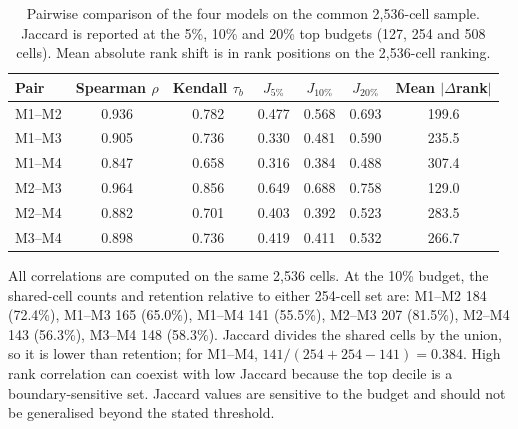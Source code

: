 \begin{table}[H]
\centering
\small
\caption{Pairwise comparison of the four models on the common 2,536-cell sample.
Jaccard is reported at the 5\%, 10\% and 20\% top budgets (127, 254 and 508
cells). Mean absolute rank shift is in rank positions on the 2,536-cell
ranking.}
\label{tab:comparison}
\begin{threeparttable}
\begin{tabular}{@{}lcccccc@{}}
\toprule
Pair & Spearman $\rho$ & Kendall $\tau_b$ & $J_{5\%}$ & $J_{10\%}$ & $J_{20\%}$ & Mean $|\Delta$rank$|$ \\
\midrule
M1--M2 & 0.936 & 0.782 & 0.477 & 0.568 & 0.693 & 199.6 \\
M1--M3 & 0.905 & 0.736 & 0.330 & 0.481 & 0.590 & 235.5 \\
M1--M4 & 0.847 & 0.658 & 0.316 & 0.384 & 0.488 & 307.4 \\
M2--M3 & 0.964 & 0.856 & 0.649 & 0.688 & 0.758 & 129.0 \\
M2--M4 & 0.882 & 0.701 & 0.403 & 0.392 & 0.523 & 283.5 \\
M3--M4 & 0.898 & 0.736 & 0.419 & 0.411 & 0.532 & 266.7 \\
\bottomrule
\end{tabular}
\begin{tablenotes}[flushleft]\footnotesize
\item All correlations are computed on the same 2,536 cells. At the 10\% budget, the shared-cell counts and retention relative to either 254-cell set are: M1--M2 184 (72.4\%), M1--M3 165 (65.0\%), M1--M4 141 (55.5\%), M2--M3 207 (81.5\%), M2--M4 143 (56.3\%), M3--M4 148 (58.3\%). Jaccard divides the shared cells by the union, so it is lower than retention; for M1--M4, $141/(254+254-141)=0.384$. High rank correlation can coexist with low Jaccard because the top decile is a boundary-sensitive set. Jaccard values are sensitive to the budget and should not be generalised beyond the stated threshold.
\end{tablenotes}
\end{threeparttable}
\end{table}
